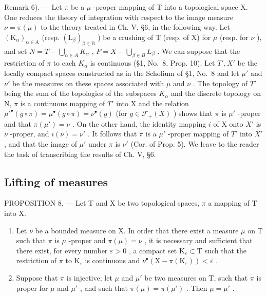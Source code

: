 Remark 6). --- Let \(\pi\) be a \(\mu\) -proper mapping of T into a topological space X. One reduces the theory of integration with respect to the image measure \(\nu = \pi(\mu)\) to the theory treated in Ch. V, §6, in the following way. Let \((\mathrm{K}_{\alpha})_{\alpha \in \mathrm{A}}\) (resp. \((\mathrm{L}_{\beta})_{\beta \in \mathrm{B}}\) ) be a crushing of T (resp. of X) for \(\mu\) (resp. for \(\nu\) ), and set \(N = T - \bigcup_{\alpha \in A} K_{\alpha}\) , \(P = X - \bigcup_{\beta \in B} L_{\beta}\) . We can suppose that the restriction of \(\pi\) to each \(K_{\alpha}\) is continuous (§1, No.~8, Prop. 10). Let \(T', X'\) be the locally compact spaces constructed as in the Scholium of §1, No.~8 and let \(\mu'\) and \(\nu'\) be the measures on these spaces associated with \(\mu\) and \(\nu\) . The topology of \(T'\) being the sum of the topologies of the subspaces \(K_{\alpha}\) and the discrete topology on N, \(\pi\) is a continuous mapping of \(T'\) into X and the relation \(\mu'^{\bullet}(g \circ \pi) = \mu^{\bullet}(g \circ \pi) = \nu^{\bullet}(g)\) (for \(g \in \mathcal{F}_{+}(X)\) ) shows that \(\pi\) is \(\mu'\) -proper and that \(\pi(\mu') = \nu\) . On the other hand, the identity mapping \(i\) of X onto \(X'\) is \(\nu\) -proper, and \(i(\nu) = \nu'\) . It follows that \(\pi\) is a \(\mu'\) -proper mapping of \(T'\) into \(X'\) , and that the image of \(\mu'\) under \(\pi\) is \(\nu'\) (Cor. of Prop. 5). We leave to the reader the task of transcribing the results of Ch. V, §6.

\subsection{Lifting of measures}

PROPOSITION 8. --- Let T and X be two topological spaces, \(\pi\) a mapping of T into X.

\begin{enumerate}
\def\labelenumi{\alph{enumi})}
\item
  Let \(\nu\) be a bounded measure on X. In order that there exist a measure \(\mu\) on T such that \(\pi\) is \(\mu\) -proper and \(\pi(\mu) = \nu\) , it is necessary and sufficient that there exist, for every number \(\varepsilon > 0\) , a compact set \(\mathrm{K}_{\varepsilon} \subset \mathrm{T}\) such that the restriction of \(\pi\) to \(\mathrm{K}_{\varepsilon}\) is continuous and \(\nu^{\bullet}(\mathrm{X} - \pi(\mathrm{K}_{\varepsilon})) < \varepsilon\) .
\item
  Suppose that \(\pi\) is injective; let \(\mu\) and \(\mu'\) be two measures on T, such that \(\pi\) is proper for \(\mu\) and \(\mu'\) , and such that \(\pi(\mu) = \pi(\mu')\) . Then \(\mu = \mu'\) .
\end{enumerate}

